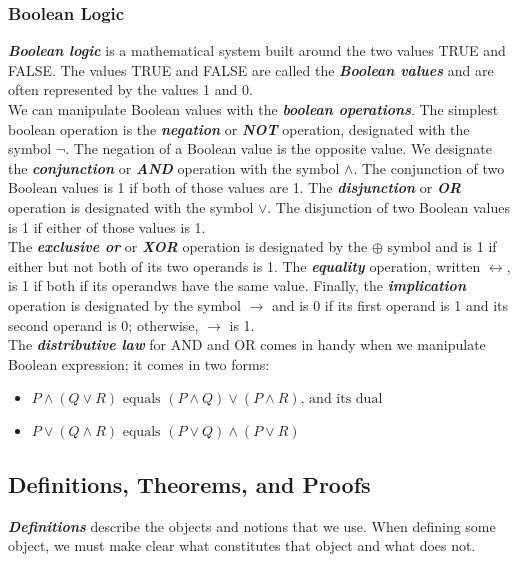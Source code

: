 \documentclass{article}
\theoremstyle{definition}
\newcommand{\define}[1]{\textbf{\textit{#1}}}
\begin{document}
\subsubsection{Boolean Logic}

\define{Boolean logic} is a mathematical system built around the two values TRUE and FALSE. The values TRUE and FALSE are called the \define{Boolean values} and are often represented by the values 1 and 0. \\ 

  We can manipulate Boolean values with the \define{boolean operations}. The simplest boolean operation is the \define{negation} or \define{NOT} operation, designated with the symbol $\neg$. The negation of a Boolean value is the opposite value. We designate the \define{conjunction} or \define{AND} operation with the symbol $\land$. The conjunction of two Boolean values is 1 if both of those values are 1. The \define{disjunction} or \define{OR} operation is designated with the symbol $\lor$. The disjunction of two Boolean values is 1 if either of those values is 1. \\ 

  The \define{exclusive or} or \define{XOR} operation is designated by the $\oplus$ symbol and is 1 if either but not both of its two operands is 1. The \define{equality} operation, written $\leftrightarrow$, is 1 if both if its operandws have the same value. Finally, the \define{implication} operation is designated by the symbol $\rightarrow$ and is 0 if its first operand is 1 and its second operand is 0; otherwise, $\rightarrow$ is 1. \\ 

The \define{distributive law} for AND and OR comes in handy when we manipulate Boolean expression; it comes in two forms: 

\begin{itemize}
  \item $P \land (Q \lor R) \textrm{ equals } (P \land Q) \lor (P \land R) \textrm{, and its dual}$
  \item $P \lor (Q \land R) \textrm{ equals } (P \lor Q) \land (P \lor R)$
\end{itemize}

\subsection{Definitions, Theorems, and Proofs}

\define{Definitions} describe the objects and notions that we use. When defining some object, we must make clear what constitutes that object and what does not. \\
\end{document}

